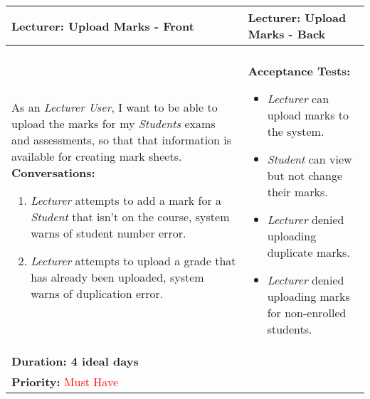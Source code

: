 \documentclass[11pt]{article}
\begin{document}
\begin{center}
\begin{tabular}{ | m{8cm}  |  m{8cm}  | } 
 \hline
 \textbf{Lecturer: Upload Marks - Front} &  \textbf{Lecturer: Upload Marks - Back}  \\ 
  \hline
&\\[5pt]
As an \emph{Lecturer User}, I want to be able to upload the marks for my \emph{Students} exams and assessments, so that that information is available for creating mark sheets.
\newline
\textbf{Conversations:}
\begin{enumerate}
\item{\emph{Lecturer} attempts to add a mark for a \emph{Student} that isn't on the course, system warns of student number error.}
\item{\emph{Lecturer} attempts to upload a grade that has already been uploaded, system warns of duplication error.}
\end{enumerate}
& \textbf{Acceptance Tests:} 
\begin{itemize}
\item{\emph{Lecturer} can upload marks to the system.}
\item{\emph{Student} can view but not change their marks.}
\item{\emph{Lecturer} denied uploading duplicate marks.} 
\item{\emph{Lecturer} denied uploading marks for non-enrolled students.}
\end{itemize} \\
\textbf{Duration: 4 ideal days} &\\
\textbf{Priority:}  \textcolor{red}{Must Have} & \\
 \hline
\end{tabular}
\end{center}
\end{document}
